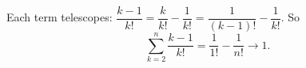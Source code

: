 Each term telescopes: $\dfrac{k-1}{k!}=\dfrac{k}{k!}-\dfrac{1}{k!}=\dfrac{1}{(k-1)!}-\dfrac{1}{k!}$. So
\[
\sum_{k=2}^{n}\dfrac{k-1}{k!}=\dfrac{1}{1!}-\dfrac{1}{n!}\to\boxed{1}.
\]
